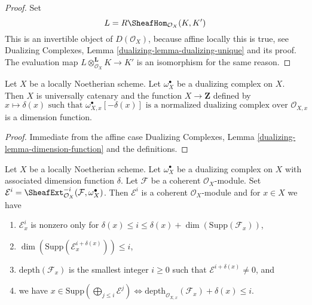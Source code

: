 \begin{proof}
Set
$$
L = R\SheafHom_{\mathcal{O}_X}(K, K')
$$
This is an invertible object of $D(\mathcal{O}_X)$, because affine locally
this is true, see Dualizing Complexes, Lemma
\ref{dualizing-lemma-dualizing-unique} and its proof.
The evaluation map $L \otimes_{\mathcal{O}_X}^\mathbf{L} K \to K'$
is an isomorphism for the same reason.
\end{proof}

\begin{lemma}
\label{lemma-dimension-function-scheme}
Let $X$ be a locally Noetherian scheme. Let $\omega_X^\bullet$
be a dualizing complex on $X$. Then $X$ is universally catenary
and the function
$X \to \mathbf{Z}$ defined by
$$
x \longmapsto \delta(x)\text{ such that }
\omega_{X, x}^\bullet[-\delta(x)]
\text{ is a normalized dualizing complex over }
\mathcal{O}_{X, x}
$$
is a dimension function.
\end{lemma}

\begin{proof}
Immediate from the affine case
Dualizing Complexes, Lemma \ref{dualizing-lemma-dimension-function}
and the definitions.
\end{proof}

\begin{lemma}
\label{lemma-sitting-in-degrees}
Let $X$ be a locally Noetherian scheme. Let $\omega_X^\bullet$
be a dualizing complex on $X$ with associated dimension function $\delta$.
Let $\mathcal{F}$ be a coherent $\mathcal{O}_X$-module. Set
$\mathcal{E}^i = \SheafExt^{-i}_{\mathcal{O}_X}(\mathcal{F}, \omega_X^\bullet)$.
Then $\mathcal{E}^i$ is a coherent $\mathcal{O}_X$-module and
for $x \in X$ we have
\begin{enumerate}
\item $\mathcal{E}^i_x$ is nonzero only for
$\delta(x) \leq i \leq \delta(x) + \dim(\text{Supp}(\mathcal{F}_x))$,
\item $\dim(\text{Supp}(\mathcal{E}^{i + \delta(x)}_x)) \leq i$,
\item $\text{depth}(\mathcal{F}_x)$ is the smallest integer
$i \geq 0$ such that $\mathcal{E}^{i + \delta(x)} \not = 0$, and
\item we have
$x \in \text{Supp}(\bigoplus_{j \leq i} \mathcal{E}^j)
\Leftrightarrow
\text{depth}_{\mathcal{O}_{X, x}}(\mathcal{F}_x) + \delta(x) \leq i$.
\end{enumerate}
\end{lemma}

